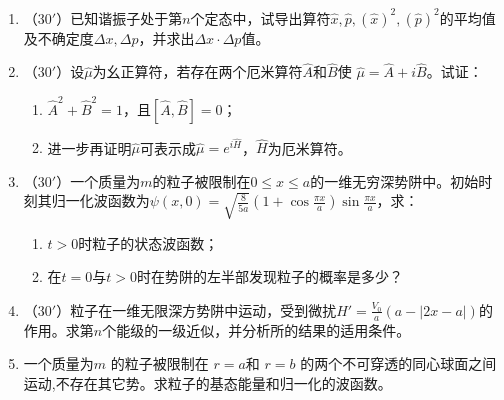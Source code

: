 

\begin{enumerate}
	\item
（$30'$）已知谐振子处于第$n$个定态中，试导出算符$\hat{x},\hat{p},(\hat{x})^2,(\hat{p})^2$的平均值及不确定度$\Delta x,\Delta p$，并求出$\Delta x\cdot\Delta p$值。


\banswer{
	
}


\item 
（$30'$）设$\hat{\mu}$为幺正算符，若存在两个厄米算符$\hat{A}$和$\hat{B}$使
$\hat{\mu}=\hat{A}+i\hat{B}$。试证：
\begin{enumerate}
	\item
	$\hat{A}^2+\hat{B}^2=1$，且$[\hat{A},\hat{B}]=0$；

\item 
进一步再证明$\hat{\mu}$可表示成$\hat{\mu}=e^{i\hat{H}}$，$\hat{H}$为厄米算符。
\end{enumerate}

\banswer{
	
}


\item 
（$30'$）一个质量为$m$的粒子被限制在$0\le x\le a$的一维无穷深势阱中。初始时刻其归一化波函数为$\psi(x,0)=\sqrt{\frac{8}{5a}}(1+\cos\frac{\pi x}{a})\sin\frac{\pi x}{a}$，求：
\begin{enumerate}
	\item
$t>0$时粒子的状态波函数；

\item 
在$t=0$与$t>0$时在势阱的左半部发现粒子的概率是多少？
\end{enumerate}


\banswer{
	
}


\newpage
\item 
（$30'$）粒子在一维无限深方势阱中运动，受到微扰$H'=\frac{V_0}{a}(a-|2x-a|)$的作用。求第$n$个能级的一级近似，并分析所的结果的适用条件。

\banswer{
	
}


\item 
一个质量为$m$ 的粒子被限制在 $r = a $和 $r = b$ 的两个不可穿透的同心球面之间运动,不存在其它势。求粒子的基态能量和归一化的波函数。

\banswer{
	
}

	
\end{enumerate}

